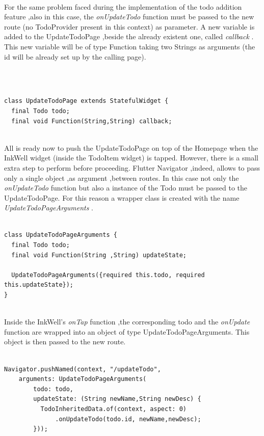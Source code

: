 \mbox{}\\
For the same problem faced during the implementation of the todo addition feature ,also in this case, the \textit{onUpdateTodo } function must be passed to the new route (no TodoProvider present in this context) as parameter. A new variable is added to the UpdateTodoPage ,beside the already existent one, called \textit{callback }. This new variable will be of type Function taking two Strings as arguments (the id will be already set up by the calling page).
\begin{code}
\mbox{}\\
\mbox{}
\label{code:2.39}
\begin{verbatim}

class UpdateTodoPage extends StatefulWidget {
  final Todo todo;
  final void Function(String,String) callback;
 \end{verbatim}
 \end{code}
 \mbox{}\\
All is ready now to push the UpdateTodoPage on top of the Homepage when the InkWell widget (inside the TodoItem widget) is tapped. However, there is a small extra step to perform before proceeding.  Flutter Navigator ,indeed, allows to pass only a single object ,as argument ,between routes. In this case not only the \textit{onUpdateTodo} function but also a instance of the Todo must be passed to the UpdateTodoPage. For this reason a wrapper class is created with the name \textit{UpdateTodoPageArguments }.
\mbox{}\\
\begin{code}
\mbox{}
\label{code:2.40}
\begin{verbatim}

class UpdateTodoPageArguments {
  final Todo todo;
  final void Function(String ,String) updateState;

  UpdateTodoPageArguments({required this.todo, required this.updateState});
}
\end{verbatim}
\end{code}
\mbox{}\\
Inside the InkWell’s \textit{onTap }function ,the corresponding todo and the \textit{onUpdate} function are wrapped into an object of type UpdateTodoPageArguments. This object is then passed to the new route.
\mbox{}\\
\begin{code}
\mbox{}
\label{code:2.42}
\begin{verbatim}

Navigator.pushNamed(context, "/updateTodo",
    arguments: UpdateTodoPageArguments(
        todo: todo,
        updateState: (String newName,String newDesc) {
          TodoInheritedData.of(context, aspect: 0)
              .onUpdateTodo(todo.id, newName,newDesc);
        }));
\end{verbatim}
\end{code}
